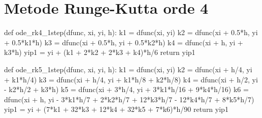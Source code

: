 \section{Metode Runge-Kutta orde 4}

\begin{pythoncode}
def ode_rk4_1step(dfunc, xi, yi, h):
    k1 = dfunc(xi, yi)
    k2 = dfunc(xi + 0.5*h, yi + 0.5*k1*h)
    k3 = dfunc(xi + 0.5*h, yi + 0.5*k2*h)
    k4 = dfunc(xi + h, yi + k3*h)
    yip1 = yi + (k1 + 2*k2 + 2*k3 + k4)*h/6
    return yip1
\end{pythoncode}


\begin{pythoncode}
def ode_rk5_1step(dfunc, xi, yi, h):
    k1 = dfunc(xi, yi)
    k2 = dfunc(xi + h/4, yi + k1*h/4)
    k3 = dfunc(xi + h/4, yi + k1*h/8 + k2*h/8)
    k4 = dfunc(xi + h/2, yi - k2*h/2 + k3*h)
    k5 = dfunc(xi + 3*h/4, yi + 3*k1*h/16 + 9*k4*h/16)
    k6 = dfunc(xi + h, yi - 3*k1*h/7 + 2*k2*h/7 + 12*k3*h/7 - 12*k4*h/7 + 8*k5*h/7)
    yip1 = yi + (7*k1 + 32*k3 + 12*k4 + 32*k5 + 7*k6)*h/90
    return yip1
\end{pythoncode}